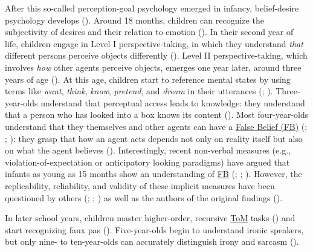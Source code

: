 \documentclass[
]{scrbook}
\begin{document}
After this so-called perception-goal psychology emerged in infancy, belief-desire psychology develops (). Around 18 months, children can recognize the subjectivity of desires and their relation to emotion (). In their second year of life, children engage in Level I perspective-taking, in which they understand \emph{that} different persons perceive objects differently (). Level II perspective-taking, which involves \emph{how} other agents perceive objects, emerges one year later, around three years of age (). At this age, children start to reference mental states by using terms like \emph{want}, \emph{think}, \emph{know}, \emph{pretend}, and \emph{dream} in their utterances (; ). Three-year-olds understand that perceptual access leads to knowledge: they understand that a person who has looked into a box knows its content (). Most four-year-olds understand that they themselves and other agents can have a \hyperref[acronyms_FB]{False Belief (FB)} (; ; ): they grasp that how an agent acts depends not only on reality itself but also on what the agent believes (). Interestingly, recent non-verbal measures (e.g., violation-of-expectation or anticipatory looking paradigms) have argued that infants as young as 15 months show an understanding of \hyperref[acronyms_FB]{FB} (; ; ). However, the replicability, reliability, and validity of these implicit measures have been questioned by others (; ; ) as well as the authors of the original findings ().

In later school years, children master higher-order, recursive \hyperref[acronyms_ToM]{ToM} tasks () and start recognizing faux pas (). Five-year-olds begin to understand ironic speakers, but only nine- to ten-year-olds can accurately distinguish irony and sarcasm ().
\end{document}
